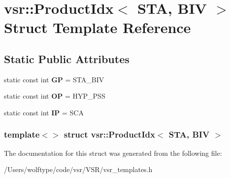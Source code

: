 \hypertarget{structvsr_1_1_product_idx_3_01_s_t_a_00_01_b_i_v_01_4}{\section{vsr\-:\-:Product\-Idx$<$ S\-T\-A, B\-I\-V $>$ Struct Template Reference}
\label{structvsr_1_1_product_idx_3_01_s_t_a_00_01_b_i_v_01_4}
}
\subsection*{Static Public Attributes}
\begin{DoxyCompactItemize}
\item 
\hypertarget{structvsr_1_1_product_idx_3_01_s_t_a_00_01_b_i_v_01_4_ae97702386bd3bd18b7b937272589fc25}{static const int {\bfseries G\-P} = S\-T\-A\-\_\-\-B\-I\-V}\label{structvsr_1_1_product_idx_3_01_s_t_a_00_01_b_i_v_01_4_ae97702386bd3bd18b7b937272589fc25}

\item 
\hypertarget{structvsr_1_1_product_idx_3_01_s_t_a_00_01_b_i_v_01_4_a95d75241c96e7ef3b022746435480b11}{static const int {\bfseries O\-P} = H\-Y\-P\-\_\-\-P\-S\-S}\label{structvsr_1_1_product_idx_3_01_s_t_a_00_01_b_i_v_01_4_a95d75241c96e7ef3b022746435480b11}

\item 
\hypertarget{structvsr_1_1_product_idx_3_01_s_t_a_00_01_b_i_v_01_4_a9d79aa1cdaf15b166aa4f22c13678bd8}{static const int {\bfseries I\-P} = S\-C\-A}\label{structvsr_1_1_product_idx_3_01_s_t_a_00_01_b_i_v_01_4_a9d79aa1cdaf15b166aa4f22c13678bd8}

\end{DoxyCompactItemize}
\subsubsection*{template$<$$>$ struct vsr\-::\-Product\-Idx$<$ S\-T\-A, B\-I\-V $>$}



The documentation for this struct was generated from the following file\-:\begin{DoxyCompactItemize}
\item 
/\-Users/wolftype/code/vsr/\-V\-S\-R/vsr\-\_\-templates.\-h\end{DoxyCompactItemize}
